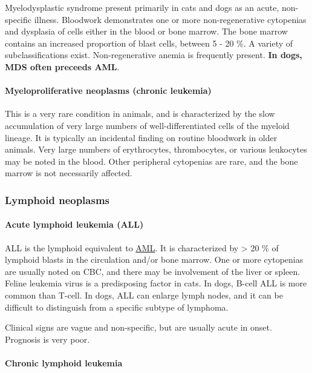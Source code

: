 \documentclass[openany]{article}
\let\oldparagraph\paragraph
\renewcommand{\paragraph}[1]{\oldparagraph{#1}\mbox{}}
\begin{document}
Myelodysplastic syndrome present primarily in cats and dogs as an acute,
non-specific illness. Bloodwork demonstrates one or more
non-regenerative cytopenias and dysplasia of cells either in the blood
or bone marrow. The bone marrow contains an increased proportion of
blast cells, between 5 - 20 \%. A variety of subclassifications exist.
Non-regenerative anemia is frequently present. \textbf{In dogs, MDS
often preceeds AML}.

\paragraph{Myeloproliferative neoplasms (chronic
leukemia)}\label{myeloproliferative-neoplasms-chronic-leukemia}

This is a very rare condition in animals, and is characterized by the
slow accumulation of very large numbers of well-differentiated cells of
the myeloid lineage. It is typically an incidental finding on routine
bloodwork in older animals. Very large numbers of erythrocytes,
thrombocytes, or various leukocytes may be noted in the blood. Other
peripheral cytopenias are rare, and the bone marrow is not necessarily
affected.

\subsubsection{Lymphoid neoplasms}\label{lymphoid-neoplasms}

\paragraph{Acute lymphoid leukemia
(ALL)}\label{acute-lymphoid-leukemia-all}

ALL is the lymphoid equivalent to
\protect\hyperlink{acute-myeloid-leukemia-aml}{AML}. It is characterized
by \textgreater{} 20 \% of lymphoid blasts in the circulation and/or
bone marrow. One or more cytopenias are usually noted on CBC, and there
may be involvement of the liver or spleen. Feline leukemia virus is a
predisposing factor in cats. In dogs, B-cell ALL is more common than
T-cell. In dogs, ALL can enlarge lymph nodes, and it can be difficult to
distinguish from a specific subtype of lymphoma.

Clinical signs are vague and non-specific, but are usually acute in
onset. Prognosis is very poor.

\paragraph{Chronic lymphoid leukemia}\label{chronic-lymphoid-leukemia}
\end{document}
